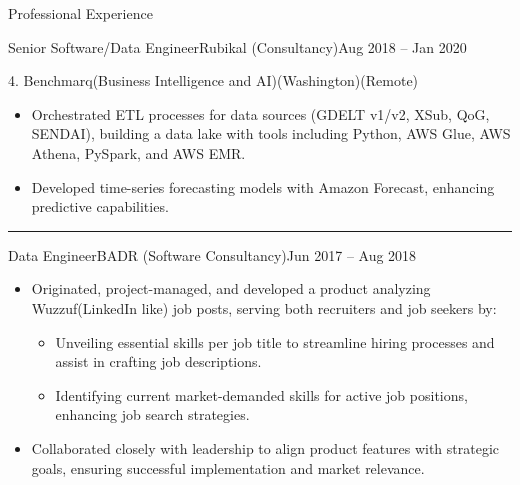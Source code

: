 \documentclass[]{ahmedamrcv}
\begin{document}
\begin{cvsection}{Professional Experience}
\begin{cvsubsection}{Senior Software/Data Engineer}{Rubikal (Consultancy)}{Aug 2018 -- Jan 2020}
		\begin{cvsubsection}{4. Benchmarq}{(Business Intelligence and AI)}{(Washington)(Remote)}	
			\begin{itemize}
				\item Orchestrated ETL processes for data sources (GDELT v1/v2, XSub, QoG, SENDAI), building a data lake with tools including Python, AWS Glue, AWS Athena, PySpark, and AWS EMR.
				\item Developed time-series forecasting models with Amazon Forecast, enhancing predictive capabilities.
			\end{itemize}
		\end{cvsubsection}
            
            \end{cvsubsection}
            

            \centering\rule{300pt}{0.4pt}

            \begin{cvsubsection}{Data Engineer}{BADR (Software Consultancy)}{Jun 2017 -- Aug 2018}
                \begin{itemize}
                    \item Originated, project-managed, and developed a product analyzing Wuzzuf(LinkedIn like) job posts, serving both recruiters and job seekers by:
                    \begin{itemize}
                        \item Unveiling essential skills per job title to streamline hiring processes and assist in crafting job descriptions.
                        \item Identifying current market-demanded skills for active job positions, enhancing job search strategies.
                    \end{itemize}
                    \item Collaborated closely with leadership to align product features with strategic goals, ensuring successful implementation and market relevance.
                \end{itemize}


\end{cvsubsection}
\end{cvsection}
\end{document}
